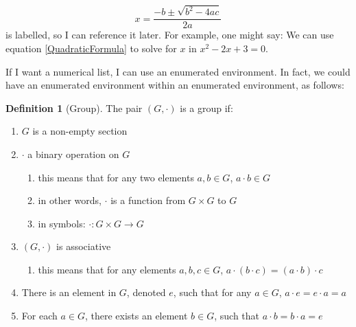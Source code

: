 \documentclass[10pt]{article}
\theoremstyle{definition}
\newtheorem{definition}[equation]{Definition}
\theoremstyle{plain}
\begin{document}
\setcounter{equation}{2}
\begin{equation} \label{QuadraticFormula}
  x=\frac{-b\pm \sqrt{b^2 - 4ac}}{2a}
\end{equation}
is labelled, so I can reference it later. For example, one might say: We can use equation \eqref{QuadraticFormula} to solve for $x$ in $x^2-2x+3=0$.

If I want a numerical list, I can use an enumerated environment. In fact, we could have an enumerated environment within an enumerated environment, as follows:
\begin{definition}[Group]
   The pair $(G,\cdot)$ is a group if:
  \begin{enumerate}
    \item $G$ is a non-empty section
    \item $\cdot$ a binary operation on $G$
    \begin{enumerate}
      \item this means that for any two elements $a,b\in G$, $a\cdot b\in G$
      \item in other words, $\cdot$ is a function from $G\times G$ to $G$
      \item in symbols: $\cdot : G\times G \rightarrow G$
    \end{enumerate}
    \item $(G,\cdot)$ is associative
    \begin{enumerate}
      \item this means that for any elements $a,b,c\in G$, $a\cdot (b\cdot c)= (a\cdot b)\cdot c$
    \end{enumerate}
    \item There is an element in $G$, denoted $e$, such that for any $a\in G$, $a\cdot e = e\cdot a = a$
    \item For each $a\in G$, there exists an element $b\in G$, such that $a\cdot b = b\cdot a = e$
  \end{enumerate}
\end{definition}
\end{document}
